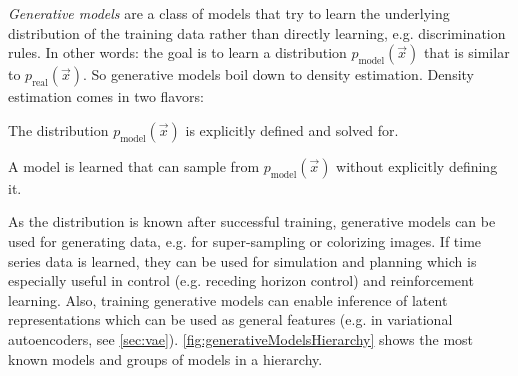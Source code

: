 	\emph{Generative models} are a class of models that try to learn the underlying distribution of the training data rather than directly learning, e.g. discrimination rules. In other words: the goal is to learn a distribution \( p_\mathrm{model}(\vec{x}) \) that is similar to \( p_\mathrm{real}(\vec{x}) \). So generative models boil down to density estimation. Density estimation comes in two flavors:
	\begin{description}[leftmargin = 2cm]
		\item[Explicit] The distribution \( p_\mathrm{model}(\vec{x}) \) is explicitly defined and solved for.
		\item[Implicit] A model is learned that can sample from \( p_\mathrm{model}(\vec{x}) \) without explicitly defining it.
	\end{description}
	As the distribution is known after successful training, generative models can be used for generating data, e.g. for super-sampling or colorizing images. If time series data is learned, they can be used for simulation and planning which is especially useful in control (e.g. receding horizon control) and reinforcement learning. Also, training generative models can enable inference of latent representations which can be used as general features (e.g. in variational autoencoders, see \autoref{sec:vae}). \autoref{fig:generativeModelsHierarchy} shows the most known models and groups of models in a hierarchy.

